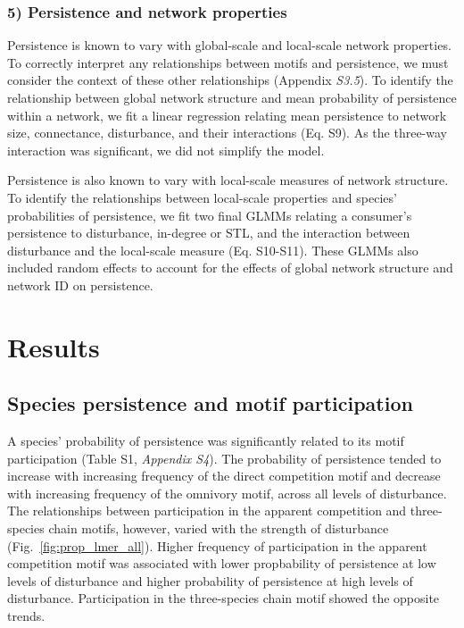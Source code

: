 \documentclass[12pt]{article}
\begin{document}
\begin{spacing}{2.0}
        \subsubsection*{5) Persistence and network properties}
            
            Persistence is known to vary with global-scale and local-scale network properties.
            To correctly interpret any relationships between motifs and persistence, we must consider the context of these other relationships (Appendix \emph{S3.5}).
            To identify the relationship between global network structure and mean probability of persistence within a network, we fit a linear regression relating mean persistence to network size, connectance, disturbance, and their interactions (Eq. S9).
            As the three-way interaction was significant, we did not simplify the model. 


            Persistence is also known to vary with local-scale measures of network structure. 
            To identify the relationships between local-scale properties and species' probabilities of persistence, we fit two final GLMMs relating a consumer's persistence to disturbance, in-degree or STL, and the interaction between disturbance and the local-scale measure (Eq. S10-S11).
            These GLMMs also included random effects to account for the effects of global network structure and network ID on persistence.


\section*{Results}

    \subsection*{Species persistence and motif participation} 

        A species' probability of persistence was significantly related to its motif participation (Table S1, \emph{Appendix S4}).
        The probability of persistence tended to increase with increasing frequency of the direct competition motif and decrease with increasing frequency of the omnivory motif, across all levels of disturbance.
        The relationships between participation in the apparent competition and three-species chain motifs, however, varied with the strength of disturbance (Fig.~\ref{fig:prop_lmer_all}).
        Higher frequency of participation in the apparent competition motif was associated with lower propbability of persistence at low levels of disturbance and higher probability of persistence at high levels of disturbance.
        Participation in the three-species chain motif showed the opposite trends.
    


\end{spacing}
\end{document}
